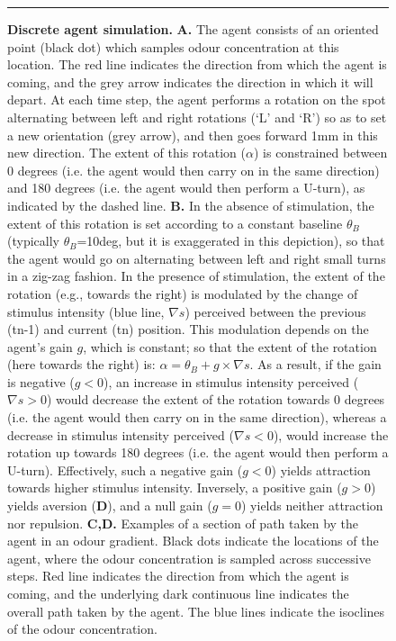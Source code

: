 \documentclass[11pt,a4paper]{article}
\begin{document}


\begin{figure}[ht!]
\begin{center}
\caption{
{\bf Discrete agent simulation.}
{\bf A.} The agent consists of an oriented point (black dot) which samples odour concentration at this location. The red line indicates the direction from which the agent is coming, and the grey arrow indicates the direction in which it will depart. At each time step, the agent performs a rotation on the spot alternating between left and right rotations (`L' and `R') so as to set a new orientation (grey arrow), and then goes forward 1mm in this new direction. The extent of this rotation ($\alpha$) is constrained between 0 degrees (i.e. the agent would then carry on in the same direction) and 180 degrees (i.e. the agent would then perform a U-turn), as indicated by the dashed line.
{\bf B.} In the absence of stimulation, the extent of this rotation is set according to a constant baseline $\theta_{B}$ (typically $\theta_{B}$=10deg, but it is exaggerated in this depiction), so that the agent would go on alternating between left and right small turns in a zig-zag fashion.
 In the presence of stimulation, the extent of the rotation (e.g., towards the right) is modulated by the change of stimulus intensity (blue line, $\nabla s$) perceived between the previous (tn-1) and current (tn) position. This modulation depends on the agent's gain $g$, which is constant; so that the extent of the rotation (here towards the right) is: $\alpha=\theta_{B}+g\times\nabla s$.
 As a result, if the gain is negative ($g<0$), an increase in stimulus intensity perceived ($\nabla s>0$) would decrease the extent of the rotation towards 0 degrees (i.e. the agent would then carry on in the same direction), whereas a decrease in stimulus intensity perceived ($\nabla s<0$), would increase the rotation up towards 180 degrees (i.e. the agent would then perform a U-turn). Effectively, such a negative gain ($g<0$) yields attraction towards higher stimulus intensity. Inversely, a positive gain ($g>0$) yields aversion ({\bf D}), and a null gain ($g=0$) yields neither attraction nor repulsion.
{\bf C,D.} Examples of a section of path taken by the agent in an odour gradient. Black dots indicate the locations of the agent, where the odour concentration is sampled across successive steps. Red line indicates the direction from which the agent is coming, and the underlying dark continuous line indicates the overall path taken by the agent. The blue lines indicate the isoclines of the odour concentration.
 \label{fig:MethodAgent}
}
\end{center}
\hrule
\end{figure}
\end{document}
